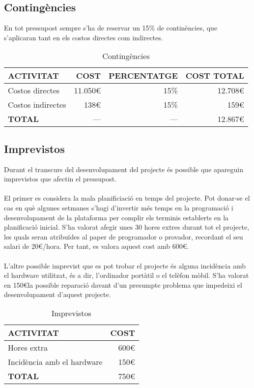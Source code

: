 \subsection{Contingències}

En tot pressupost sempre s’ha de reservar un 15\% de continències, que s’aplicaran tant en els costos directes com indirectes.
\\
\begin{table}[H]
\centering
\begin{tabular}{ | l | r | r | r |}
\hline
\textbf{ACTIVITAT}&\textbf{COST}&\textbf{PERCENTATGE}&\textbf{COST TOTAL} 		\\ \hline
Costos directes					 	& 11.050\euro	& 15\%		& 12.708\euro		\\ \hline
Costos indirectes				 	& 138\euro		& 15\%		& 159\euro			\\ \hline
\textbf{TOTAL}					 	& --- 			& ---		& 12.867\euro		\\ 
\hline
\end{tabular}
\caption{Contingències}
\end{table}

\subsection{Imprevistos}

Durant el transcurs del desenvolupament del projecte és possible que apareguin imprevistos que afectin el pressupost.
\\\\
El primer es considera la mala planificiació en temps del projecte. Pot donar-se el cas en què algunes setmanes s’hagi d’invertir més temps en la programació i desenvolupament de la plataforma per complir els terminis establerts en la planificació inicial. S’ha valorat afegir unes 30 hores extres durant tot el projecte, les quals seran atribuïdes al paper de programador o provador, recordant el seu salari de 20\euro/hora. Per tant, es valora aquest cost amb 600\euro.
\\\\
L’altre possible imprevist que es pot trobar el projecte és alguna incidència amb el hardware utilitzat, és a dir, l’ordinador portàtil o el telèfon mòbil. S’ha valorat en 150\euro\space la possible reparació davant d’un presumpte problema que impedeixi el desenvolupament d’aquest projecte.
\\
\begin{table}[H]
\centering
\begin{tabular}{ | l | r |}
\hline
\textbf{ACTIVITAT}								&\textbf{COST} 		\\ \hline
Hores extra										& 600\euro			\\ \hline
Incidència amb el hardware						& 150\euro			\\ \hline
\textbf{TOTAL}					 				& 750\euro			\\ 
\hline
\end{tabular}
\caption{Imprevistos}
\end{table}

